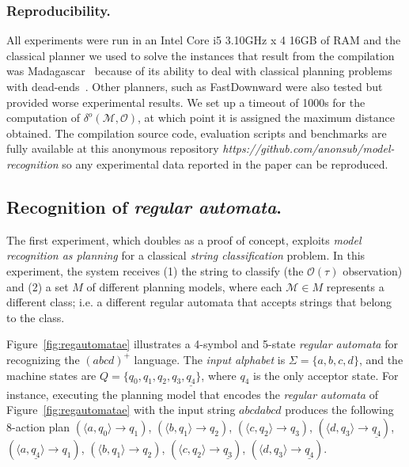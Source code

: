 \documentclass[letterpaper]{article} %
\begin{document}
\subsubsection{Reproducibility.} All experiments were run in an Intel Core i5 3.10GHz x 4 16GB of RAM and the classical planner we used to solve the instances that result from the compilation was {\sc Madagascar}~\cite{rintanen2014madagascar} because of its ability to deal with classical planning problems with dead-ends~\cite{lopez2015deterministic}. Other planners, such as FastDownward were also tested but provided worse experimental results. We set up a timeout of 1000s for the computation of $\delta^o(\mathcal{M},\mathcal{O})$, at which point it is assigned the maximum distance obtained. The compilation source code, evaluation scripts and benchmarks are fully available at this anonymous repository {\em https://github.com/anonsub/model-recognition} so any experimental data reported in the paper can be reproduced.


\subsection{Recognition of {\em regular automata}.} The first experiment, which doubles as a proof of concept, exploits {\em model recognition as planning} for a classical {\em string classification} problem. In this experiment, the system receives (1) the string to classify (the $\mathcal{O}(\tau)$ observation) and (2) a set $M$ of different planning models, where each $\mathcal{M}\in M$ represents a different class; i.e. a different regular automata that accepts strings that belong to the class.

Figure~\ref{fig:regautomatae} illustrates a 4-symbol and 5-state {\em regular automata} for recognizing the $(abcd)^+$ language. The {\em input alphabet} is $\Sigma=\{a,b,c,d\}$, and the machine states are $Q=\{q_0,q_1,q_2,q_3,\underline{q_4}\}$, where \underline{$q_4$} is the only acceptor state. For instance, executing the planning model that encodes the {\em regular automata} of Figure~\ref{fig:regautomatae} with the input string $abcdabcd$ produces the following 8-action plan {\small $(\langle a,q_0\rangle\rightarrow q_1)$, $(\langle b,q_1\rangle\rightarrow q_2)$, $(\langle c,q_2\rangle\rightarrow q_3)$, $(\langle d,q_3\rangle\rightarrow \underline{q_4})$, $(\langle a,\underline{q_4}\rangle\rightarrow q_1)$, $(\langle b,q_1\rangle\rightarrow q_2)$, $(\langle c,q_2\rangle\rightarrow \underline{q_3})$, $(\langle d,q_3\rangle\rightarrow \underline{q_4})$}.
\end{document}
